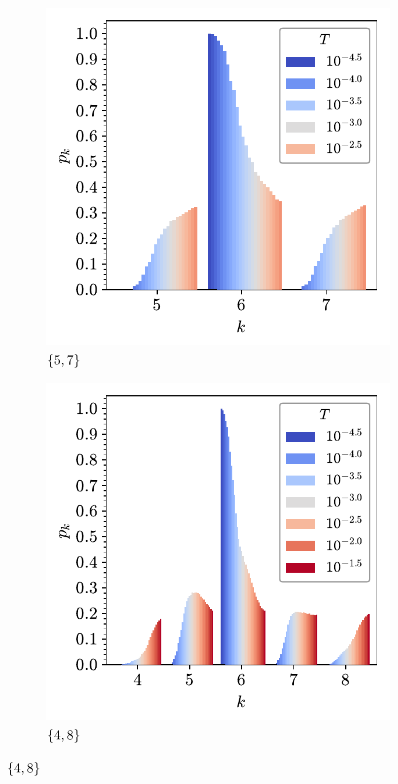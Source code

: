 \begin{figure}[bt]
     \centering
     
     \begin{subfigure}[b]{0.45\textwidth}
         \centering
         \includegraphics[width=\textwidth]{./figures/bilayers/triraft_57.pdf}
         \caption{$\left\{5,7\right\}$}
         \label{fig:trpk1}
     \end{subfigure}
     \hfill
	\begin{subfigure}[b]{0.45\textwidth}
         \centering
         \includegraphics[width=\textwidth]{./figures/bilayers/triraft_48.pdf}
         \caption{$\left\{4,8\right\}$}
         \label{fig:trpk2}
     \end{subfigure}
     \hfill
     

\end{figure}
